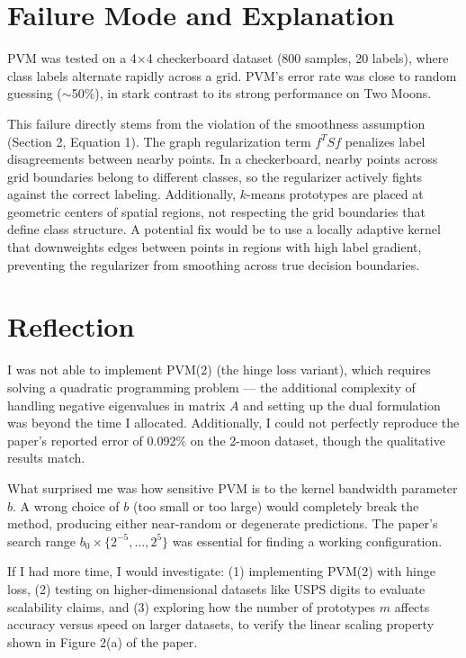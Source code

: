 \documentclass[10pt, conference]{IEEEtran}
\begin{document}
\section{Failure Mode and Explanation}

PVM was tested on a 4$\times$4 checkerboard dataset (800 samples, 20 labels), where class labels alternate rapidly across a grid. PVM's error rate was close to random guessing ($\sim$50\%), in stark contrast to its strong performance on Two Moons.

This failure directly stems from the violation of the smoothness assumption (Section 2, Equation 1). The graph regularization term $f^T S f$ penalizes label disagreements between nearby points. In a checkerboard, nearby points across grid boundaries belong to different classes, so the regularizer actively fights against the correct labeling. Additionally, $k$-means prototypes are placed at geometric centers of spatial regions, not respecting the grid boundaries that define class structure. A potential fix would be to use a locally adaptive kernel that downweights edges between points in regions with high label gradient, preventing the regularizer from smoothing across true decision boundaries.

\section{Reflection}

I was not able to implement PVM(2) (the hinge loss variant), which requires solving a quadratic programming problem --- the additional complexity of handling negative eigenvalues in matrix $A$ and setting up the dual formulation was beyond the time I allocated. Additionally, I could not perfectly reproduce the paper's reported error of 0.092\% on the 2-moon dataset, though the qualitative results match.

What surprised me was how sensitive PVM is to the kernel bandwidth parameter $b$. A wrong choice of $b$ (too small or too large) would completely break the method, producing either near-random or degenerate predictions. The paper's search range $b_0 \times \{2^{-5}, \ldots, 2^5\}$ was essential for finding a working configuration.

If I had more time, I would investigate: (1) implementing PVM(2) with hinge loss, (2) testing on higher-dimensional datasets like USPS digits to evaluate scalability claims, and (3) exploring how the number of prototypes $m$ affects accuracy versus speed on larger datasets, to verify the linear scaling property shown in Figure 2(a) of the paper.
\end{document}
